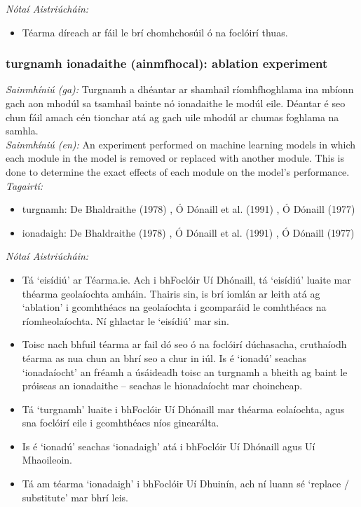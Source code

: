  \noindent \textit{Nótaí Aistriúcháin:}
\begin{itemize}
	\item Téarma díreach ar fáil le brí chomhchosúil ó na foclóirí thuas.
\end{itemize}


\subsubsection*{turgnamh ionadaithe (ainmfhocal): ablation experiment}
 \noindent \textit{Sainmhíniú (ga):} Turgnamh a dhéantar ar shamhail ríomhfhoghlama ina mbíonn gach aon mhodúl sa tsamhail bainte nó ionadaithe le modúl eile. Déantar é seo chun fáil amach cén tionchar atá ag gach uile mhodúl ar chumas foghlama na samhla.
\\
 \noindent \textit{Sainmhíniú (en):} An experiment performed on machine learning models in which each module in the model is removed or replaced with another module. This is done to determine the exact effects of each module on the model's performance.
\\
 \noindent \textit{Tagairtí:}
\begin{itemize}
	\item turgnamh: De Bhaldraithe (1978) \cite{de-bhaldraithe}, Ó Dónaill et al. (1991) \cite{focloir-beag}, Ó Dónaill (1977) \cite{odonaill}
	\item ionadaigh: De Bhaldraithe (1978) \cite{de-bhaldraithe}, Ó Dónaill et al. (1991) \cite{focloir-beag}, Ó Dónaill (1977) \cite{odonaill}
\end{itemize}

 \noindent \textit{Nótaí Aistriúcháin:}
\begin{itemize}
	\item Tá `eisídiú' ar Téarma.ie. Ach i bhFoclóir Uí Dhónaill, tá `eisídiú' luaite mar théarma geolaíochta amháin. Thairis sin, is brí iomlán ar leith atá ag `ablation' i gcomhthéacs na geolaíochta i gcomparáid le comhthéacs na ríomheolaíochta. Ní ghlactar le `eisídiú' mar sin.
	\item Toisc nach bhfuil téarma ar fail dó seo ó na foclóirí dúchasacha, cruthaíodh téarma as nua chun an bhrí seo a chur in iúl. Is é `ionadú' seachas `ionadaíocht' an fréamh a úsáideadh toisc an turgnamh a bheith ag baint le próiseas an ionadaithe -- seachas le hionadaíocht mar choincheap.
	\item Tá `turgnamh' luaite i bhFoclóir Uí Dhónaill mar théarma eolaíochta, agus sna foclóirí eile i gcomhthéacs níos ginearálta.
	\item Is é `ionadú' seachas `ionadaigh' atá i bhFoclóir Uí Dhónaill agus Uí Mhaoileoin.
	\item Tá am téarma `ionadaigh' i bhFoclóir Uí Dhuinín, ach ní luann sé `replace / substitute' mar bhrí leis.
\end{itemize}



